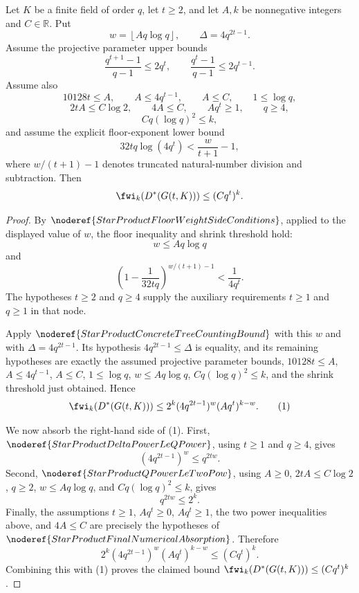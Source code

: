 \begin{helper}
Let \(K\) be a finite field of order \(q\), let \(t\ge2\), and let
\(A,k\) be nonnegative integers and \(C\in\mathbb R\).  Put
\[
  w=\left\lfloor A q\log q\right\rfloor,
  \qquad
  \Delta=4q^{2t-1}.
\]
Assume the projective parameter upper bounds
\[
  \frac{q^{t+1}-1}{q-1}\le 2q^t,\qquad
  \frac{q^t-1}{q-1}\le 2q^{t-1}.
\]
Assume also
\[
  10128t\le A,\qquad A\le4q^{t-1},\qquad A\le C,
  \qquad 1\le\log q,
\]
\[
  2tA\le C\log2,\qquad 4A\le C,\qquad Aq^t\ge1,\qquad q\ge4,
\]
\[
  Cq(\log q)^2\le k,
\]
and assume the explicit floor-exponent lower bound
\[
  32tq\log(4q^t)<\frac{w}{t+1}-1,
\]
where \(w/(t+1)-1\) denotes truncated natural-number division and
subtraction.  Then
\[
  \fwi_k(D^*(G(t,K)))\le (Cq^t)^k.
\]
\end{helper}
\begin{proof}
By \(\noderef{StarProductFloorWeightSideConditions}\), applied to the
displayed value of \(w\), the floor inequality and shrink threshold hold:
\[
  w\le Aq\log q
\]
and
\[
  \left(1-\frac{1}{32tq}\right)^{w/(t+1)-1}<\frac{1}{4q^t}.
\]
The hypotheses \(t\ge2\) and \(q\ge4\) supply the auxiliary requirements
\(t\ge1\) and \(q\ge1\) in that node.

Apply \(\noderef{StarProductConcreteTreeCountingBound}\) with this \(w\) and
with \(\Delta=4q^{2t-1}\).  Its hypothesis \(4q^{2t-1}\le\Delta\) is equality,
and its remaining hypotheses are exactly the assumed projective parameter
bounds, \(10128t\le A\), \(A\le4q^{t-1}\), \(A\le C\),
\(1\le\log q\), \(w\le Aq\log q\), \(Cq(\log q)^2\le k\), and the shrink
threshold just obtained.  Hence
\[
  \fwi_k(D^*(G(t,K)))
  \le
  2^k(4q^{2t-1})^w(Aq^t)^{k-w}.        \tag{1}
\]

We now absorb the right-hand side of (1).  First,
\(\noderef{StarProductDeltaPowerLeQPower}\), using \(t\ge1\) and \(q\ge4\),
gives
\[
  (4q^{2t-1})^w\le q^{2tw}.
\]
Second, \(\noderef{StarProductQPowerLeTwoPow}\), using \(A\ge0\),
\(2tA\le C\log2\), \(q\ge2\), \(w\le Aq\log q\), and
\(Cq(\log q)^2\le k\), gives
\[
  q^{2tw}\le2^k.
\]
Finally, the assumptions \(t\ge1\), \(Aq^t\ge0\), \(Aq^t\ge1\), the two
power inequalities above, and \(4A\le C\) are precisely the hypotheses of
\(\noderef{StarProductFinalNumericalAbsorption}\).  Therefore
\[
  2^k(4q^{2t-1})^w(Aq^t)^{k-w}\le(Cq^t)^k.
\]
Combining this with (1) proves the claimed bound
\(\fwi_k(D^*(G(t,K)))\le(Cq^t)^k\).
\end{proof}
